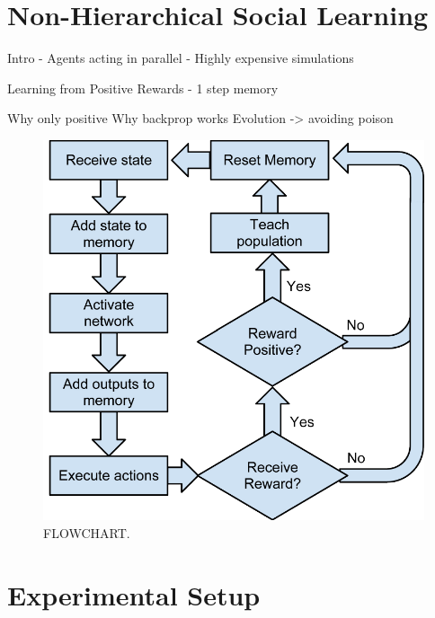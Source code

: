 \documentclass{acm_proc_article-sp}
\begin{document}

\section{Non-Hierarchical Social Learning}
\label{sec:nhsl}
Intro
    - Agents acting in parallel
    - Highly expensive simulations
    
Learning from Positive Rewards
    - 1 step memory

Why only positive
    Why backprop works
    Evolution -> avoiding poison

\begin{figure}
  \centering
    \includegraphics[scale=.6]{flowchart.pdf}
  \caption{FLOWCHART.}
  \label{fig:flowchart}
\end{figure}

\section{Experimental Setup}
\label{sec:setup}
\end{document}

